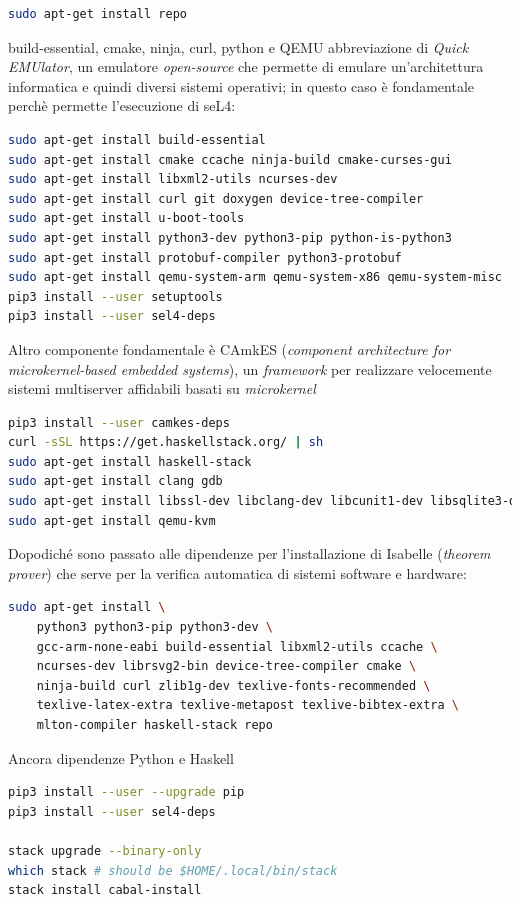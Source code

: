 \lstset{style=mystyle}

\begin{lstlisting}[language=bash]
sudo apt-get install repo
\end{lstlisting}

build-essential, cmake, ninja, curl, python e QEMU abbreviazione di \textit{Quick EMUlator}, un emulatore \textit{open-source} che permette di emulare un'architettura informatica e quindi diversi sistemi operativi; in questo caso è fondamentale perchè permette l'esecuzione di seL4:
\begin{lstlisting}[language=bash]
sudo apt-get install build-essential
sudo apt-get install cmake ccache ninja-build cmake-curses-gui
sudo apt-get install libxml2-utils ncurses-dev
sudo apt-get install curl git doxygen device-tree-compiler
sudo apt-get install u-boot-tools
sudo apt-get install python3-dev python3-pip python-is-python3
sudo apt-get install protobuf-compiler python3-protobuf
sudo apt-get install qemu-system-arm qemu-system-x86 qemu-system-misc
pip3 install --user setuptools
pip3 install --user sel4-deps
\end{lstlisting}

Altro componente fondamentale è CAmkES (\textit{component architecture for microkernel-based embedded systems}), un \textit{framework} per realizzare velocemente sistemi multiserver affidabili basati su \textit{microkernel}
\begin{lstlisting}[language=bash]
pip3 install --user camkes-deps
curl -sSL https://get.haskellstack.org/ | sh
sudo apt-get install haskell-stack
sudo apt-get install clang gdb
sudo apt-get install libssl-dev libclang-dev libcunit1-dev libsqlite3-dev
sudo apt-get install qemu-kvm
\end{lstlisting}

Dopodiché sono passato alle dipendenze per l'installazione di Isabelle (\textit{theorem prover}) che serve per la verifica automatica di sistemi software e hardware:
\begin{lstlisting}[language=bash]
sudo apt-get install \
    python3 python3-pip python3-dev \
    gcc-arm-none-eabi build-essential libxml2-utils ccache \
    ncurses-dev librsvg2-bin device-tree-compiler cmake \
    ninja-build curl zlib1g-dev texlive-fonts-recommended \
    texlive-latex-extra texlive-metapost texlive-bibtex-extra \
    mlton-compiler haskell-stack repo
\end{lstlisting}

Ancora dipendenze Python e Haskell
\begin{lstlisting}[language=bash]
pip3 install --user --upgrade pip
pip3 install --user sel4-deps

stack upgrade --binary-only
which stack # should be $HOME/.local/bin/stack
stack install cabal-install
\end{lstlisting}

